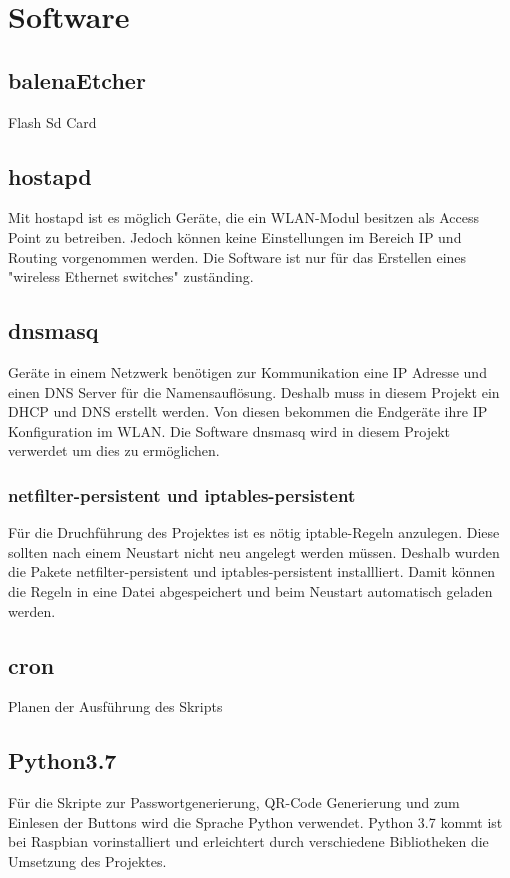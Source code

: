 \documentclass[a4paper,11pt,singlespacing]{article}
\begin{document}
    			
    	\section{Software}
    		\subsection{balenaEtcher}
    			Flash Sd Card
    		\subsection{hostapd}
        		Mit hostapd ist es möglich Geräte, die ein WLAN-Modul besitzen als Access Point zu betreiben. Jedoch können keine Einstellungen im Bereich IP und Routing vorgenommen werden. Die Software ist nur für das Erstellen eines "wireless Ethernet switches" zuständing. \cite{Quote_hostapd1} 
    		\subsection{dnsmasq}
        		Geräte in einem Netzwerk benötigen zur Kommunikation eine IP Adresse und einen DNS Server für die Namensauflösung. Deshalb muss in diesem Projekt ein DHCP und DNS erstellt werden. Von diesen bekommen die Endgeräte ihre IP Konfiguration im WLAN. Die Software dnsmasq wird in diesem Projekt verwerdet um dies zu ermöglichen.
    		\subsubsection{netfilter-persistent und iptables-persistent}
        		Für die Druchführung des Projektes ist es nötig iptable-Regeln anzulegen. Diese sollten nach einem Neustart nicht neu angelegt werden müssen. Deshalb wurden die Pakete netfilter-persistent und iptables-persistent installliert. Damit können die Regeln in eine Datei abgespeichert und beim Neustart automatisch geladen werden.
    		\subsection{cron}
			Planen der Ausführung des Skripts
    		\subsection{Python3.7}
    			Für die Skripte zur Passwortgenerierung, QR-Code Generierung und zum Einlesen der Buttons wird die Sprache Python verwendet. Python 3.7 kommt ist bei Raspbian vorinstalliert und erleichtert durch verschiedene Bibliotheken die Umsetzung des Projektes.
\end{document}
